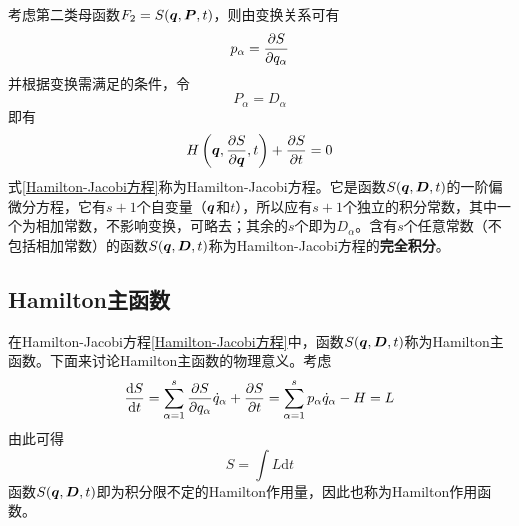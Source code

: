 考虑第二类母函数$F_2 = S(\boldsymbol{q},\boldsymbol{P},t)$，则由变换关系可有
\begin{equation*}
	p_\alpha = \frac{\partial S}{\partial q_\alpha}
\end{equation*}
并根据变换需满足的条件，令
\begin{equation*}
	P_\alpha = D_\alpha
\end{equation*}
即有
\begin{equation}
	H\left(\boldsymbol{q},\frac{\partial S}{\partial \boldsymbol{q}},t\right) + \frac{\partial S}{\partial t} = 0
	\label{Hamilton-Jacobi方程}
\end{equation}
式\eqref{Hamilton-Jacobi方程}称为{\heiti Hamilton-Jacobi方程}。它是函数$S(\boldsymbol{q},\boldsymbol{D},t)$的一阶偏微分方程，它有$s+1$个自变量（$\boldsymbol{q}$和$t$），所以应有$s+1$个独立的积分常数，其中一个为相加常数，不影响变换，可略去；其余的$s$个即为$D_\alpha$。含有$s$个任意常数（不包括相加常数）的函数$S(\boldsymbol{q},\boldsymbol{D},t)$称为Hamilton-Jacobi方程的{\bf 完全积分}。

\subsection{Hamilton主函数}

在Hamilton-Jacobi方程\eqref{Hamilton-Jacobi方程}中，函数$S(\boldsymbol{q},\boldsymbol{D},t)$称为{\heiti Hamilton主函数}。下面来讨论Hamilton主函数的物理意义。考虑
\begin{equation*}
	\frac{\mathrm{d} S}{\mathrm{d} t} = \sum_{\alpha=1}^s \frac{\partial S}{\partial q_\alpha} \dot{q}_\alpha + \frac{\partial S}{\partial t} = \sum_{\alpha=1}^s p_\alpha \dot{q}_\alpha - H = L
\end{equation*}
由此可得
\begin{equation}
	S = \int L \mathrm{d} t
	\label{Hamilton作用函数}
\end{equation}
函数$S(\boldsymbol{q},\boldsymbol{D},t)$即为积分限不定的Hamilton作用量，因此也称为{\heiti Hamilton作用函数}。

